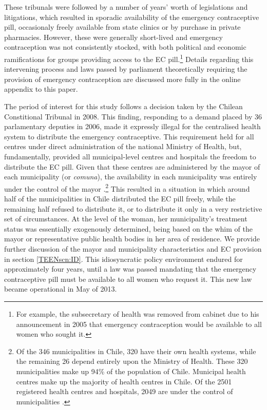 These tribunals were followed by a number of years' worth of legislations and
litigations, which resulted in sporadic availability of the emergency
contraceptive pill, occasionaly freely available from state clinics or by
purchase in private pharmacies. However, these were generally short-lived and
emergency contraception was not consistently stocked, with both political and
economic ramifications for groups providing access to the EC pill.\footnote{For
example, the subsecretary of health was removed from cabinet due to his
announcement in 2005 that emergency contraception would be available to all
women who sought it.}  Details regarding this intervening process and laws
passed by parliament theoretically requiring the provision of emergency
contraception are discussed more fully in the online appendix to this paper.

The period of interest for this study follows a decision taken by the Chilean
Constitional Tribunal in 2008.  This finding, responding to a demand placed by
36 parlamentary deputies in 2006, made it expressly illegal for the centralised
health system to distribute the emergency contraceptive.  This requirement held
for all centres under direct administration of the national Ministry of Health,
but, fundamentally, provided all municipal-level centres and hospitals the 
freedom to distribute the EC pill.  Given that these centres are administered by 
the mayor of each municipality (or \emph{comuna}), the availability in each 
municipality was entirely under the control of the mayor \citep{Didesetal2011,
Didesetal2010,Didesetal2009}.\footnote{Of the 346 municipalities in Chile, 320
have their own health systems, while the remaining 26 depend entirely upon the
Ministry of Health.  These 320 municipalities make up 94\% of the population 
of Chile.  Municipal health centres make up the majority of health centres in 
Chile.  Of the 2501 registered health centres and hospitals, 2049 are under the
control of municipalities \citep{DEIS2013}.}  This resulted in a situation in
which around half of the municipalities in Chile distributed the EC
pill freely, while the remaining half refused to distribute it, or to 
distribute it only in a very restrictive set of circumstances.  At the level
of the woman, her municipality's treatment status was essentially exogenously
determined, being based on the whim of the mayor or representative public 
health bodies in her area of residence.  We provide further discussion of the
mayor and municipality characteristics and EC provision in section 
\ref{TEENscn:ID}.  This idiosyncratic policy environment endured for 
approximately four years, until a law was passed mandating that the emergency 
contraceptive pill must be available to all women who request it.  This new 
law became operational in May of 2013.

